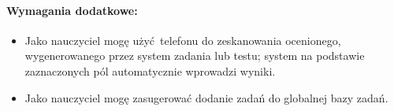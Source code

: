 \documentclass[polish,12pt]{aghthesis}
\begin{document}
\paragraph{Wymagania dodatkowe:}
\begin{itemize}
	\item Jako nauczyciel mogę użyć telefonu do zeskanowania ocenionego, wygenerowanego przez system zadania lub testu; system na podstawie zaznaczonych pól automatycznie wprowadzi wyniki.
	\item Jako nauczyciel mogę zasugerować dodanie zadań do globalnej bazy zadań.
\end{itemize}


\section{\SectionTitleRealizationAspects}
\label{sec:wybrane-aspekty-realizacji}

\section{\SectionTitleWorkOrganization}
\label{sec:organizacja-pracy}

\section{\SectionTitleResults}
\label{sec:wyniki-projektu}




\end{document}
